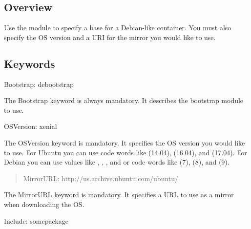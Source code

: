 \documentclass[letterpaper,10pt,english]{sphinxmanual}
\begin{document}
\subsection{Overview}
\label{\detokenize{appendix:id15}}
Use the  module to specify a base for a Debian-like container. You must also specify the OS version and a URI for the mirror you would like to use.


\subsection{Keywords}
\label{\detokenize{appendix:id16}}
%
\begin{sphinxVerbatim}[commandchars=\\\{\}]
Bootstrap: debootstrap
\end{sphinxVerbatim}

The Bootstrap keyword is always mandatory. It describes the bootstrap module to use.

%
\begin{sphinxVerbatim}[commandchars=\\\{\}]
OSVersion: xenial
\end{sphinxVerbatim}

The OSVersion keyword is mandatory. It specifies the OS version you would like to use. For Ubuntu you can use code words like  (14.04),  (16.04),
and  (17.04). For Debian you can use values like , , , and  or code words like  (7),  (8), and  (9).
\begin{quote}

%
\begin{sphinxVerbatim}[commandchars=\\\{\}]
MirrorURL:  http://us.archive.ubuntu.com/ubuntu/
\end{sphinxVerbatim}
\end{quote}

The MirrorURL keyword is mandatory. It specifies a URL to use as a mirror when downloading the OS.

%
\begin{sphinxVerbatim}[commandchars=\\\{\}]
Include: somepackage
\end{sphinxVerbatim}
\end{document}
